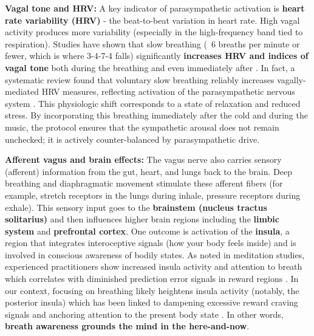 \documentclass[11pt]{article}
\begin{document}
\textbf{Vagal tone and HRV:} A key indicator of parasympathetic activation is \textbf{heart rate variability (HRV)} - the beat-to-beat variation in heart rate. High vagal activity produces more variability (especially in the high-frequency band tied to respiration). Studies have shown that slow breathing (~6 breaths per minute or fewer, which is where 3-4-7-4 falls) significantly \textbf{increases HRV and indices of vagal tone} both during the breathing and even immediately after \cite{LABORDE2022104711}. In fact, a systematic review found that voluntary slow breathing reliably increases vagally-mediated HRV measures, reflecting activation of the parasympathetic nervous system \cite{LABORDE2022104711}. This physiologic shift corresponds to a state of relaxation and reduced stress. By incorporating this breathing immediately after the cold and during the music, the protocol ensures that the sympathetic arousal does not remain unchecked; it is actively counter-balanced by parasympathetic drive.

\textbf{Afferent vagus and brain effects:} The vagus nerve also carries sensory (afferent) information from the gut, heart, and lungs back to the brain. Deep breathing and diaphragmatic movement stimulate these afferent fibers (for example, stretch receptors in the lungs during inhale, pressure receptors during exhale). This sensory input goes to the \textbf{brainstem (nucleus tractus solitarius)} and then influences higher brain regions including the \textbf{limbic system} and \textbf{prefrontal cortex}. One outcome is activation of the \textbf{insula}, a region that integrates interoceptive signals (how your body feels inside) and is involved in conscious awareness of bodily states. As noted in meditation studies, experienced practitioners show increased insula activity and attention to breath which correlates with diminished prediction error signals in reward regions \cite{KirkUlrich}. In our context, focusing on breathing likely heightens insula activity (notably, the posterior insula) which has been linked to dampening excessive reward craving signals and anchoring attention to the present body state \cite{KirkUlrich}. In other words, \textbf{breath awareness grounds the mind in the here-and-now}.
\end{document}
